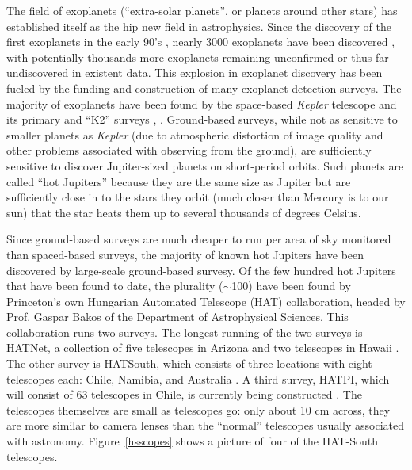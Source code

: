 
The field of exoplanets (``extra-solar planets'', or planets around other stars) has established itself as the hip new field in astrophysics. Since the discovery of the first exoplanets in the early 90's \cite{pulsarplanet}, nearly 3000 exoplanets have been discovered \cite{exoplanetorg}, with potentially thousands more exoplanets remaining unconfirmed or thus far undiscovered in existent data.  This explosion in exoplanet discovery has been fueled by the funding and construction of many exoplanet detection surveys.  The majority of exoplanets have been found by the space-based {\it Kepler} telescope and its primary and ``K2'' surveys \cite{kepler}, \cite{k2}.  Ground-based surveys, while not as sensitive to smaller planets as {\it Kepler} (due to atmospheric distortion of image quality and other problems associated with observing from the ground), are sufficiently sensitive to discover Jupiter-sized planets on short-period orbits.  Such planets are called ``hot Jupiters'' because they are the same size as Jupiter but are sufficiently close in to the stars they orbit (much closer than Mercury is to our sun) that the star heats them up to several thousands of degrees Celsius.

  Since ground-based surveys are much cheaper to run per area of sky monitored than spaced-based surveys, the majority of known hot Jupiters have been discovered by large-scale ground-based survesy.
Of the few hundred hot Jupiters that have been found to date, the plurality (${\sim}$100) have been found by Princeton's own Hungarian Automated Telescope (HAT) collaboration, headed by Prof. Gaspar Bakos of the Department of Astrophysical Sciences.  This collaboration runs two surveys. The longest-running of the two surveys is HATNet, a collection of five telescopes in Arizona and two telescopes in Hawaii \cite{hatnet}.  The other survey is HATSouth, which consists of three locations with eight telescopes each: Chile, Namibia, and Australia \cite{hatsouth}.  A third survey, HATPI, which will consist of 63 telescopes in Chile, is currently being constructed \cite{hatpi}.  The telescopes themselves are small as telescopes go: only about 10 cm across, they are more similar to camera lenses than the ``normal'' telescopes usually associated with astronomy.  Figure~\ref{hsscopes} shows a picture of four of the HAT-South telescopes.

